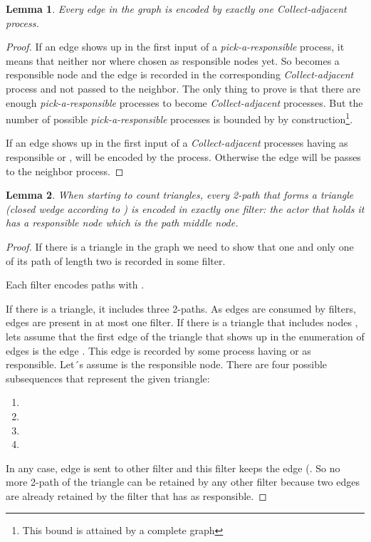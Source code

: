 \documentclass{article}                     \usepackage{graphics}
\newtheorem{lemma}{Lemma}
\begin{document}
\begin{lemma} Every edge in the graph is encoded by  exactly  one \textit{Collect-adjacent} process.
\end{lemma} 
\begin{proof}
If an edge  shows up in the first input of  a \textit{pick-a-responsible} process, it means that  neither  nor  where chosen as responsible nodes yet. So  becomes a responsible node and the edge is recorded in the corresponding \textit{Collect-adjacent}  process and not passed to the neighbor. The only thing to prove is that there are enough \textit{pick-a-responsible} processes to become  \textit{Collect-adjacent}  processes. But the number of possible  \textit{pick-a-responsible}  processes is bounded by  by construction\footnote{This bound is attained by a complete graph}.

If an edge  shows up in the first input of  a \textit{Collect-adjacent} processes having as responsible  or , will be encoded by the process. Otherwise the edge will be passes to the neighbor process.
\end{proof}
\begin{lemma}When starting to count triangles, every  2-path that forms a triangle (closed wedge according to \cite{DBLP:journals/corr/JhaSP13}) is encoded in exactly one filter: the actor that holds it has a responsible node  which  is the path middle node.
\end{lemma}
\begin{proof}
If there is a triangle in the graph we need to show that one and only one of its path of length two is recorded in some filter.

Each filter  encodes  paths   with . 

If there is a triangle, it includes three  2-paths. As edges are consumed by  filters, edges are present in at most one filter.
If there is a triangle that includes nodes , lets assume that the first edge of the triangle that shows up in the enumeration of edges is the edge . This edge is recorded  by some process having  or  as responsible. Let´s assume  is the responsible node.  There are four possible subsequences that represent the given triangle:

\begin{enumerate}
\item  
\item 
\item 
\item  
\end{enumerate} 
In any case, edge  is sent to other filter and this filter keeps the edge (. So no more 2-path  of the triangle can be retained by any other filter because  two edges are already retained by the filter that has  as responsible.
\end{proof}
\end{document}
